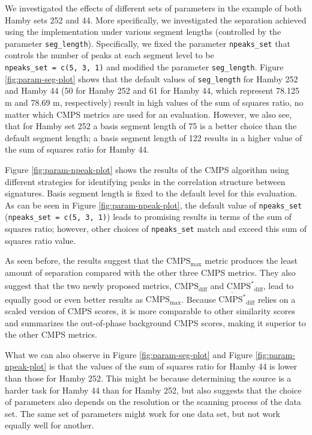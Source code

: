 We investigated the effects of different sets of parameters in the
example of both Hamby sets 252 and 44. More specifically, we
investigated the separation achieved using the 
implementation under various segment lengths (controlled by the
parameter \texttt{seg\_length}). Specifically, we fixed the parameter
\texttt{npeaks\_set} that controls the number of peaks at each segment
level to be \texttt{npeaks\_set\ =\ c(5,\ 3,\ 1)} and modified the
parameter \texttt{seg\_length}. Figure \ref{fig:param-seg-plot} shows
that the default values of \texttt{seg\_length} for Hamby 252 and Hamby
44 (50 for Hamby 252 and 61 for Hamby 44, which represent 78.125
\textmu m and 78.69 \textmu m, respectively) result in high values of
the sum of squares ratio, no matter which CMPS metrics are used for an
evaluation. However, we also see, that for Hamby set 252 a basis segment
length of 75 is a better choice than the default segment length; a basis
segment length of 122 results in a higher value of the sum of squares
ratio for Hamby 44.

Figure \ref{fig:param-npeak-plot} shows the results of the CMPS
algorithm using different strategies for identifying peaks in the
correlation structure between signatures. Basis segment length is fixed
to the default level for this evaluation. As can be seen in Figure
\ref{fig:param-npeak-plot}, the default value of \texttt{npeaks\_set}
(\texttt{npeaks\_set\ =\ c(5,\ 3,\ 1)}) leads to promising results in
terms of the sum of squares ratio; however, other choices of
\texttt{npeaks\_set} match and exceed this sum of squares ratio value.

As seen before, the results suggest that the \(\mathrm{CMPS_{max}}\)
metric produces the least amount of separation compared with the other
three CMPS metrics. They also suggest that the two newly proposed
metrics, \(\mathrm{\overline{CMPS}_{diff}}\) and
\(\mathrm{\overline{CMPS^*}_{diff}}\), lead to equally good or even
better results as \(\mathrm{\overline{CMPS}_{max}}\). Because
\(\mathrm{\overline{CMPS^*}_{diff}}\) relies on a scaled version of CMPS
scores, it is more comparable to other similarity scores and summarizes
the out-of-phase background CMPS scores, making it superior to the other
CMPS metrics.

What we can also observe in Figure \ref{fig:param-seg-plot} and Figure
\ref{fig:param-npeak-plot} is that the values of the sum of squares
ratio for Hamby 44 is lower than those for Hamby 252. This might be
because determining the source is a harder task for Hamby 44 than for
Hamby 252, but also suggests that the choice of parameters also depends
on the resolution or the scanning process of the data set. The same set
of parameters might work for one data set, but not work equally well for
another.

